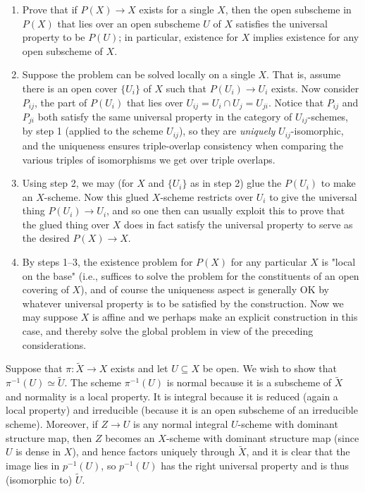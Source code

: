 \documentclass{report}
\begin{document}
\begin{enumerate}
	\item	 Prove that if $P(X) \rightarrow X$ exists for a single $X$, then the open
subscheme in $P(X)$ that lies over an open subscheme $U$ of $X$ satisfies the
universal property to be $P(U)$; in particular, existence for $X$ implies
existence for any open subscheme of $X$. 

\item Suppose the problem can be solved locally on a single $X.$ That is,
assume there is an open cover $\{U_i\}$ of $X$ such that $P(U_i)\rightarrow U_i$ exists.
Now consider $P_{ij}$, the part of $P(U_i)$ that lies over $U_{ij} = U_i \cap U_j
= U_{ji}$.  Notice that $P_{ij}$ and $P_{ji}$ both satisfy the same universal
property in the category of $U_{ij}$-schemes, by step 1 (applied to the
scheme $U_{ij}$),  so they are {\em uniquely} $U_{ij}$-isomorphic, and the
uniqueness ensures triple-overlap consistency when comparing the various
triples of isomorphisms we get over triple overlaps.

\item  Using step 2, we may (for $X$ and $\{U_i\}$ as in step 2) glue the
$P(U_i)$ to make an $X$-scheme. Now this glued $X$-scheme restricts over $U_i$
to give the universal thing $P(U_i) \rightarrow U_i$, and so one then can usually
exploit this to prove that the glued thing over $X$ does in fact satisfy the
universal property to serve as the desired $P(X) \rightarrow X$.


\item By steps 1--3, the
existence problem for $P(X)$ for any particular $X$ is "local on the base"
(i.e., suffices to solve the problem for the constituents of an open
covering of $X$), and of course the uniqueness aspect is generally OK by
whatever universal property is to be satisfied by the construction. Now we
may suppose $X$ is affine and we perhaps make an explicit construction in
this case, and thereby solve the global problem in view of the preceding
considerations.

\end{enumerate}

	Suppose that $\pi:\widetilde{X}\rightarrow X$ exists and let $U\subseteq X$ be open.
	We wish to show that $\pi^{-1}(U)\simeq \widetilde{U}$.		The scheme $\pi^{-1}(U)$
	is normal because it is a subscheme of $\widetilde{X}$ and normality is a local property.
	It is integral because it is reduced (again a local property) and irreducible (because it is an open
	subscheme of an irreducible scheme).
	Moreover, if $Z\rightarrow U$ is any normal integral $U$-scheme with dominant structure map,
	then $Z$ becomes an $X$-scheme with dominant structure map (since $U$ is dense in $X$),
	and hence factors uniquely through $\widetilde{X}$, and it is clear that the image lies in $p^{-1}(U)$,
	so $p^{-1}(U)$ has the right universal property and is thus (isomorphic to) $\widetilde{U}$.
\end{document}
